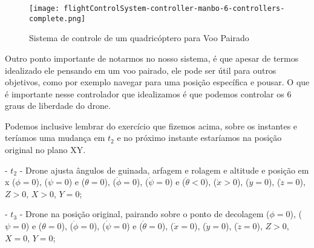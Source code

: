 \begin{figure}[H]
	\centering
	\texttt{[image: flightControlSystem-controller-manbo-6-controllers-complete.png]}
	\caption{Sistema de controle de um quadricóptero para Voo Pairado}
	\centering
	\label{Sistema de controle de um quadricóptero para Voo Pairado}
\end{figure}

Outro ponto importante de notarmos no nosso sistema, é que apesar de termos idealizado ele pensando em um voo pairado, ele pode ser útil para outros objetivos, como por exemplo navegar para uma posição específica e pousar. O que é importante nesse controlador que idealizamos é que podemos controlar os 6 graus de liberdade do drone.

Podemos inclusive lembrar do exercício que fizemos acima, sobre os instantes e teríamos uma mudança em \( t_2 \) e no próximo instante estaríamos na posição original no plano XY.

- \( t_2 \) - Drone ajusta ângulos de guinada, arfagem e rolagem e altitude e posição em x (\(\phi = 0\)), (\(\psi = 0\)) e (\(\theta = 0\)), (\(\dot{\phi} = 0\)), (\(\dot{\psi} = 0\)) e (\(\dot{\theta} < 0\)), (\(\dot{x} > 0\)), (\(\dot{y} = 0\)), (\(\dot{z} = 0\)), \( Z > 0 \), \( X > 0 \), \( Y = 0 \);

- \( t_3 \) - Drone na posição original, pairando sobre o ponto de decolagem (\(\phi = 0\)), (\(\psi = 0\)) e (\(\theta = 0\)), (\(\dot{\phi} = 0\)), (\(\dot{\psi} = 0\)) e (\(\dot{\theta} = 0\)), (\(\dot{x} = 0\)), (\(\dot{y} = 0\)), (\(\dot{z} = 0\)), \( Z > 0 \), \( X = 0 \), \( Y = 0 \);
\printindex
